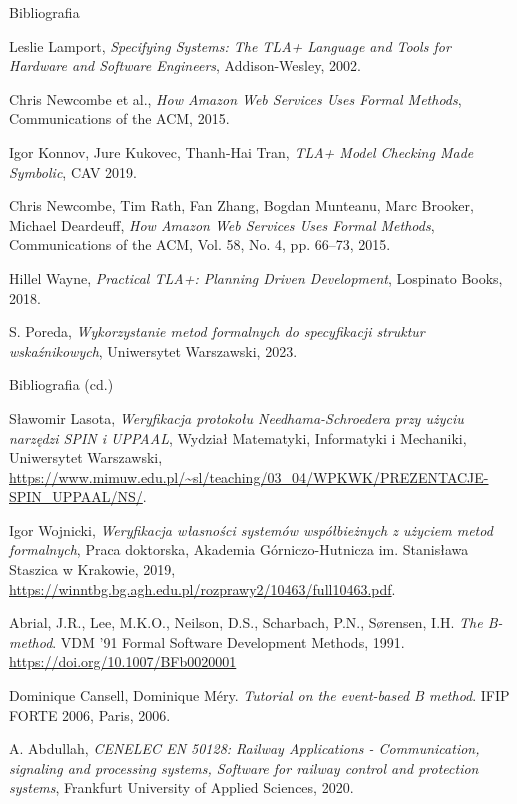 \documentclass{beamer}
\begin{document}
\begin{frame}{Bibliografia}
  \scriptsize
  \begin{thebibliography}{9}
    Leslie Lamport, \emph{Specifying Systems: The TLA+ Language and Tools for Hardware and Software Engineers}, Addison-Wesley, 2002.
  
    Chris Newcombe et al., \emph{How Amazon Web Services Uses Formal Methods}, Communications of the ACM, 2015.
  
    Igor Konnov, Jure Kukovec, Thanh-Hai Tran, \emph{TLA+ Model Checking Made Symbolic}, CAV 2019.
    
    Chris Newcombe, Tim Rath, Fan Zhang, Bogdan Munteanu, Marc Brooker, Michael Deardeuff, \emph{How Amazon Web Services Uses Formal Methods}, Communications of the ACM, Vol. 58, No. 4, pp. 66--73, 2015.

    Hillel Wayne, \emph{Practical TLA+: Planning Driven Development}, Lospinato Books, 2018.
    
    S. Poreda,
    \textit{Wykorzystanie metod formalnych do specyfikacji struktur wskaźnikowych},
    Uniwersytet Warszawski, 2023.
  \end{thebibliography}
\end{frame}

\begin{frame}{Bibliografia (cd.)}
  \scriptsize
  \begin{thebibliography}{9}
    Sławomir Lasota,
    \textit{Weryfikacja protokołu Needhama-Schroedera przy użyciu narzędzi SPIN i UPPAAL},
    Wydział Matematyki, Informatyki i Mechaniki, Uniwersytet Warszawski,
    \url{https://www.mimuw.edu.pl/~sl/teaching/03_04/WPKWK/PREZENTACJE-SPIN_UPPAAL/NS/}.

    Igor Wojnicki,
    \textit{Weryfikacja własności systemów współbieżnych z użyciem metod formalnych},
    Praca doktorska, Akademia Górniczo-Hutnicza im. Stanisława Staszica w Krakowie, 2019,
    \url{https://winntbg.bg.agh.edu.pl/rozprawy2/10463/full10463.pdf}.


    Abrial, J.R., Lee, M.K.O., Neilson, D.S., Scharbach, P.N., Sørensen, I.H. \emph{The B-method}. VDM '91 Formal Software Development Methods, 1991. \url{https://doi.org/10.1007/BFb0020001}

    Dominique Cansell, Dominique Méry. \emph{Tutorial on the event-based B method}. IFIP FORTE 2006, Paris, 2006.

    A. Abdullah, \emph{CENELEC EN 50128: Railway Applications - Communication, signaling and processing systems, Software for railway control and protection systems}, Frankfurt University of Applied Sciences, 2020.
  \end{thebibliography}
\end{frame}
\end{document}
